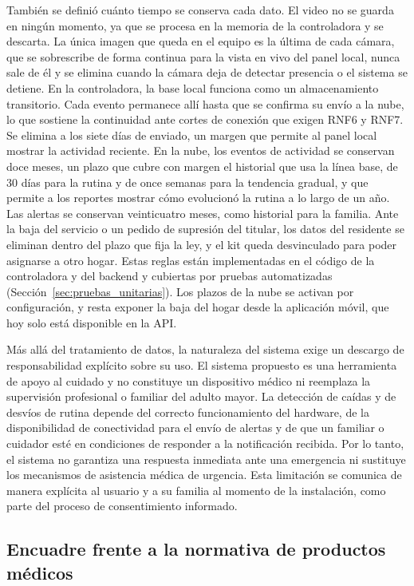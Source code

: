 También se definió cuánto tiempo se conserva cada dato.
El video no se guarda en ningún momento, ya que se procesa en la memoria de la controladora y se descarta.
La única imagen que queda en el equipo es la última de cada cámara, que se sobrescribe de forma continua para la vista en vivo del panel local, nunca sale de él y se elimina cuando la cámara deja de detectar presencia o el sistema se detiene.
En la controladora, la base local funciona como un almacenamiento transitorio.
Cada evento permanece allí hasta que se confirma su envío a la nube, lo que sostiene la continuidad ante cortes de conexión que exigen RNF6 y RNF7.
Se elimina a los siete días de enviado, un margen que permite al panel local mostrar la actividad reciente.
En la nube, los eventos de actividad se conservan doce meses, un plazo que cubre con margen el historial que usa la línea base, de 30 días para la rutina y de once semanas para la tendencia gradual, y que permite a los reportes mostrar cómo evolucionó la rutina a lo largo de un año.
Las alertas se conservan veinticuatro meses, como historial para la familia.
Ante la baja del servicio o un pedido de supresión del titular, los datos del residente se eliminan dentro del plazo que fija la ley, y el kit queda desvinculado para poder asignarse a otro hogar.
Estas reglas están implementadas en el código de la controladora y del backend y cubiertas por pruebas automatizadas (Sección~\ref{sec:pruebas_unitarias}).
Los plazos de la nube se activan por configuración, y resta exponer la baja del hogar desde la aplicación móvil, que hoy solo está disponible en la API.

Más allá del tratamiento de datos, la naturaleza del sistema exige un descargo de responsabilidad explícito sobre su uso.
El sistema propuesto es una herramienta de apoyo al cuidado y no constituye un dispositivo médico ni reemplaza la supervisión profesional o familiar del adulto mayor.
La detección de caídas y de desvíos de rutina depende del correcto funcionamiento del hardware, de la disponibilidad de conectividad para el envío de alertas y de que un familiar o cuidador esté en condiciones de responder a la notificación recibida.
Por lo tanto, el sistema no garantiza una respuesta inmediata ante una emergencia ni sustituye los mecanismos de asistencia médica de urgencia.
Esta limitación se comunica de manera explícita al usuario y a su familia al momento de la instalación, como parte del proceso de consentimiento informado.

\subsection{Encuadre frente a la normativa de productos médicos}
\label{sec:encuadre_producto_medico}

